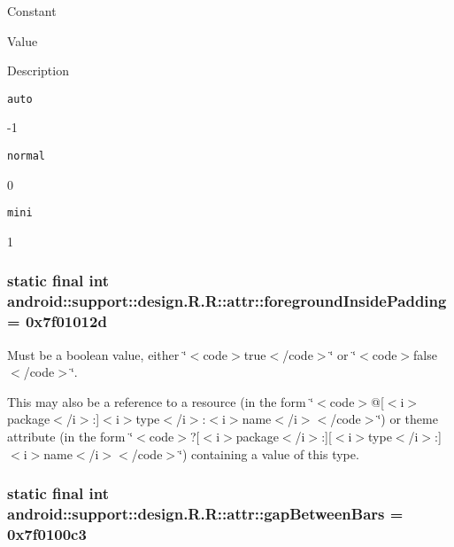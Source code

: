 Constant

Value

Description 

{\tt auto}

-1

{\tt normal}

0

{\tt mini}

1\hypertarget{classandroid_1_1support_1_1design_1_1_r_1_1attr_30d91a88601d07be9e2ef10cea013063}{
\subsubsection[{foregroundInsidePadding}]{\setlength{\rightskip}{0pt plus 5cm}static final int android::support::design.R.R::attr::foregroundInsidePadding = 0x7f01012d}}
\label{classandroid_1_1support_1_1design_1_1_r_1_1attr_30d91a88601d07be9e2ef10cea013063}


Must be a boolean value, either \char`\"{}$<$code$>$true$<$/code$>$\char`\"{} or \char`\"{}$<$code$>$false$<$/code$>$\char`\"{}. 

This may also be a reference to a resource (in the form \char`\"{}$<$code$>$@\mbox{[}$<$i$>$package$<$/i$>$:\mbox{]}$<$i$>$type$<$/i$>$:$<$i$>$name$<$/i$>$$<$/code$>$\char`\"{}) or theme attribute (in the form \char`\"{}$<$code$>$?\mbox{[}$<$i$>$package$<$/i$>$:\mbox{]}\mbox{[}$<$i$>$type$<$/i$>$:\mbox{]}$<$i$>$name$<$/i$>$$<$/code$>$\char`\"{}) containing a value of this type. \hypertarget{classandroid_1_1support_1_1design_1_1_r_1_1attr_5cd62d31c10eaaba331b61a37d9e7d37}{
\subsubsection[{gapBetweenBars}]{\setlength{\rightskip}{0pt plus 5cm}static final int android::support::design.R.R::attr::gapBetweenBars = 0x7f0100c3}}
\label{classandroid_1_1support_1_1design_1_1_r_1_1attr_5cd62d31c10eaaba331b61a37d9e7d37}


